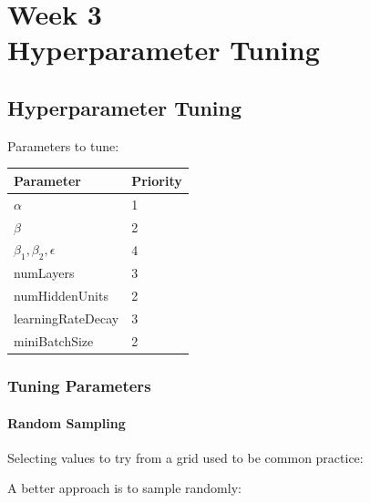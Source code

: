 
\chapter{Week 3 \\ Hyperparameter Tuning}


\section{Hyperparameter Tuning}

Parameters to tune:
\begin{tabular}{|l|l|}
    \hline
    Parameter & Priority \\
    \hline
    $\alpha$ & 1 \\
    \hline
    $\beta$ & 2 \\
    \hline
    $\beta_1, \beta_2, \epsilon$ & 4 \\
    \hline
    numLayers & 3 \\
    \hline
    numHiddenUnits & 2 \\
    \hline
    learningRateDecay & 3 \\
    \hline
    miniBatchSize & 2 \\
    \hline
\end{tabular}

\subsection*{Tuning Parameters}

\subsubsection*{Random Sampling}

Selecting values to try from a grid used to be common practice:

A better approach is to sample randomly:


